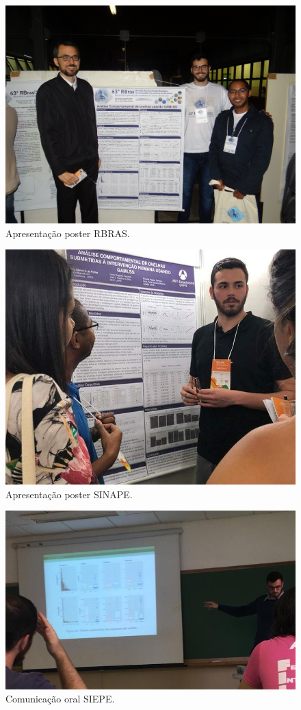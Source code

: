 \documentclass[
  ignorenonframetext,
  serif,
  professionalfont,
  usenames,
  dvipsnames,
  aspectratio = 169]{beamer}
\begin{document}
\begin{frame}{}
\protect\hypertarget{section-4}{}
\begin{figure}

{\centering \includegraphics[width=0.65\linewidth]{./img/rbras} 

}

\caption{Apresentação poster RBRAS.}\label{fig:unnamed-chunk-15}
\end{figure}
\end{frame}

\begin{frame}{}
\protect\hypertarget{section-5}{}
\begin{figure}

{\centering \includegraphics[width=0.6\linewidth]{./img/sinape} 

}

\caption{Apresentação poster SINAPE.}\label{fig:unnamed-chunk-16}
\end{figure}
\end{frame}

\begin{frame}{}
\protect\hypertarget{section-6}{}
\begin{figure}

{\centering \includegraphics[width=0.7\linewidth]{./img/siepe} 

}

\caption{Comunicação oral SIEPE.}\label{fig:unnamed-chunk-17}
\end{figure}
\end{frame}
\end{document}

